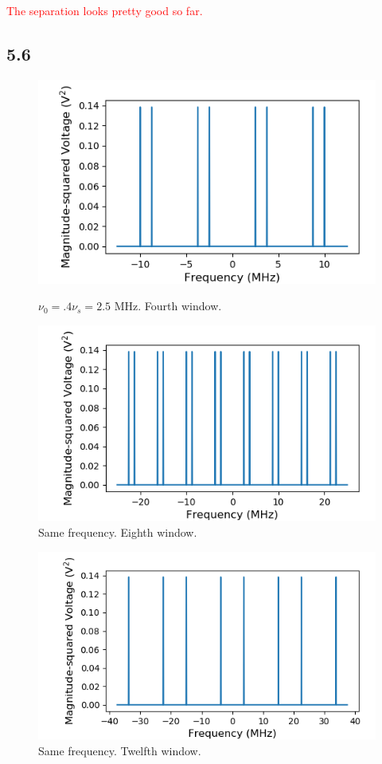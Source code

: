 \documentclass[a4paper]{article}
\begin{document}
\textcolor{red}{The separation looks pretty good so far.}

\subsection{5.6}

\begin{figure}
\centering
\begin{minipage}{.5\textwidth}
	\centering
	\includegraphics[width=.9\linewidth]{5-6/4window}
	\caption{$\nu_0 = .4 \nu_s = 2.5$ MHz. Fourth window.}
	\label{fig:win4}
\end{minipage}%
\begin{minipage}{.5\textwidth}
	\centering
	\includegraphics[width=.9\linewidth]{5-6/8window}
	\caption{Same frequency. Eighth window.}
	\label{fig:win8}
\end{minipage}
\end{figure}

\begin{figure}
\centering
\includegraphics[width=.45\linewidth]{5-6/12window}
\caption{Same frequency. Twelfth window.}
\label{fig:win12}
\end{figure}
\end{document}
